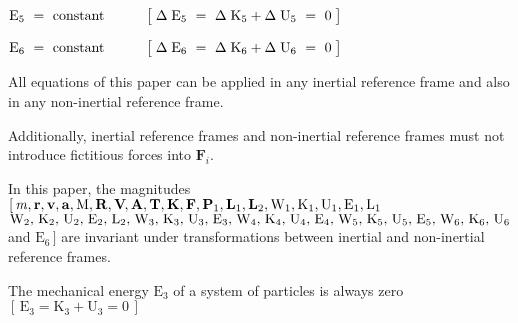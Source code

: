 \documentclass[10pt]{article}
\newcommand{\spb}{\hspace{+0.015em}}
\newcommand{\spc}{\hspace{+0.150em}}
\begin{document}
\par \bigskip\medskip ${\mathrm{E}}_5 ~=~ {\mathrm{constant}} \hspace{+3.00em} \big [ \; \Delta \; {\mathrm{E}}_5 ~=~ \Delta \; {\mathrm{K}}_5 + \Delta \; {\mathrm{U}}_5 ~=~ 0 \; \big ]$

\par \bigskip ${\mathrm{E}}_6 ~=~ {\mathrm{constant}} \hspace{+3.00em} \big [ \; \Delta \; {\mathrm{E}}_6 ~=~ \Delta \; {\mathrm{K}}_6 + \Delta \; {\mathrm{U}}_6 ~=~ 0 \; \big ]$

\newpage

\par {}

\par \bigskip\smallskip \noindent All equations of this paper can be applied in any inertial reference frame and also in any non-inertial reference frame.

\par \bigskip\smallskip \noindent Additionally, inertial reference frames and non-inertial reference frames must not introduce fictitious forces into ${\mathbf{F}}_i$.

\par \bigskip\smallskip \noindent In this paper, the magnitudes $[ \, {\mathit{m}},\spb {\mathbf{r}},\spb {\mathbf{v}},\spb {\mathbf{a}},\spb {\mathrm{M}},\spb {\mathbf{R}},\spb {\mathbf{V}}\hspace{-0.120em},\spb {\mathbf{A}},\spb {\mathbf{T}},\spb {\mathbf{K}},\spb {\mathbf{F}},\spb {\mathbf{P}}_1,\spb {\mathbf{L}}_1,\spb {\mathbf{L}}_2,\spb {\mathrm{W}}_1,\spb {\mathrm{K}}_1,\spb {\mathrm{U}}_1,\spb {\mathrm{E}}_1,\spb {\mathrm{L}}_1$ ${\mathrm{W}}_2,\spc {\mathrm{K}}_2,\spc {\mathrm{U}}_2,\spc {\mathrm{E}}_2,\spc {\mathrm{L}}_2,\spc {\mathrm{W}}_3,\spc {\mathrm{K}}_3,\spc {\mathrm{U}}_3,\spc {\mathrm{E}}_3,\spc {\mathrm{W}}_4,\spc {\mathrm{K}}_4,\spc {\mathrm{U}}_4,\spc {\mathrm{E}}_4,\spc {\mathrm{W}}_5,\spc {\mathrm{K}}_5,\spc {\mathrm{U}}_5,\spc {\mathrm{E}}_5,\spc {\mathrm{W}}_6,\spc {\mathrm{K}}_6,\spc {\mathrm{U}}_6$ and ${\mathrm{E}}_6 \, ]$ are invariant under transformations between inertial and non-inertial reference frames.

\par \bigskip\smallskip \noindent The mechanical energy ${\mathrm{E}}_3$ of a system of particles is always zero $[ \, {\mathrm{E}}_3 = {\mathrm{K}}_3 + {\mathrm{U}}_3 = 0 \, ]$
\end{document}
